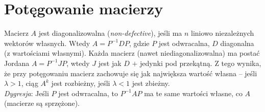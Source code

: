 \section{Potęgowanie macierzy}
Macierz \( A \) jest diagonalizowalna (\textit{non-defective}), jeśli ma \( n \) liniowo niezależnych wektorów własnych. Wtedy \( A = P^{-1}DP \), gdzie \( P \) jest odwracalna, \( D \) diagonalna (z wartościami własnymi). Każda macierz (nawet niediagonalizowalna) ma postać Jordana \( A = P^{-1}JP \), wtedy \( J \) jest jak \( D \) \( + \) jedynki pod przekątną. Z tego wynika, że przy potęgowaniu macierz zachowuje się jak największa wartość własna – jeśli \( \lambda > 1 \), ciąg \( A^k \) jest rozbieżny, jeśli \( \lambda < 1 \) jest zbieżny. \\
\textit{Dygresja}: Jeśli \( P \) jest odwracalna, to \( P^{-1}AP \) ma te same wartości własne, co \( A \) (macierze są sprzężone).